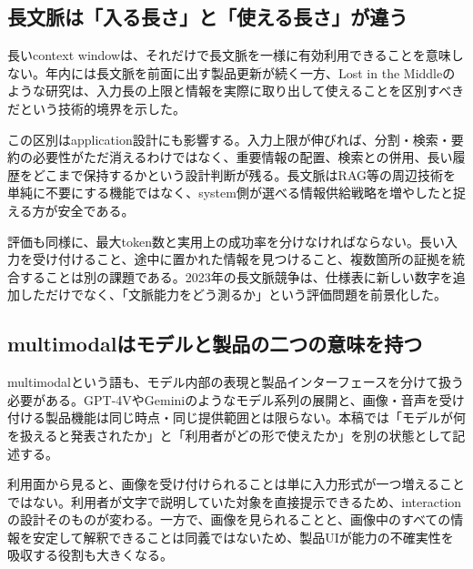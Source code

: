 \subsection{長文脈は「入る長さ」と「使える長さ」が違う}

長いcontext windowは、それだけで長文脈を一様に有効利用できることを意味しない。年内には長文脈を前面に出す製品更新が続く一方、Lost in the Middleのような研究は、入力長の上限と情報を実際に取り出して使えることを区別すべきだという技術的境界を示した。\autocite{src-013fa77665db,src-2b6af707f3ef,src-39071a9443e5,src-93d355bf8806,src-a3dead6cff65,src-b1525886b462,src-db671ee1d1b8,src-f5041642fb21,src-fd9cb9c0061f}


この区別はapplication設計にも影響する。入力上限が伸びれば、分割・検索・要約の必要性がただ消えるわけではなく、重要情報の配置、検索との併用、長い履歴をどこまで保持するかという設計判断が残る。長文脈はRAG等の周辺技術を単純に不要にする機能ではなく、system側が選べる情報供給戦略を増やしたと捉える方が安全である。\autocite{src-013fa77665db,src-2b6af707f3ef,src-39071a9443e5,src-b1525886b462,src-f5041642fb21}


評価も同様に、最大token数と実用上の成功率を分けなければならない。長い入力を受け付けること、途中に置かれた情報を見つけること、複数箇所の証拠を統合することは別の課題である。2023年の長文脈競争は、仕様表に新しい数字を追加しただけでなく、「文脈能力をどう測るか」という評価問題を前景化した。\autocite{src-013fa77665db,src-2b6af707f3ef,src-39071a9443e5,src-b1525886b462,src-f5041642fb21}


\subsection{multimodalはモデルと製品の二つの意味を持つ}

multimodalという語も、モデル内部の表現と製品インターフェースを分けて扱う必要がある。GPT-4VやGeminiのようなモデル系列の展開と、画像・音声を受け付ける製品機能は同じ時点・同じ提供範囲とは限らない。本稿では「モデルが何を扱えると発表されたか」と「利用者がどの形で使えたか」を別の状態として記述する。\autocite{src-3375c5d27d9b,src-5bfa9c93d034,src-93d355bf8806,src-a3dead6cff65,src-a95452783369,src-db671ee1d1b8,src-f951bda6a0f4,src-fd9cb9c0061f}


利用面から見ると、画像を受け付けられることは単に入力形式が一つ増えることではない。利用者が文字で説明していた対象を直接提示できるため、interactionの設計そのものが変わる。一方で、画像を見られることと、画像中のすべての情報を安定して解釈できることは同義ではないため、製品UIが能力の不確実性を吸収する役割も大きくなる。\autocite{src-3375c5d27d9b,src-5bfa9c93d034,src-93d355bf8806,src-a3dead6cff65,src-a95452783369,src-db671ee1d1b8,src-f951bda6a0f4,src-fd9cb9c0061f}



